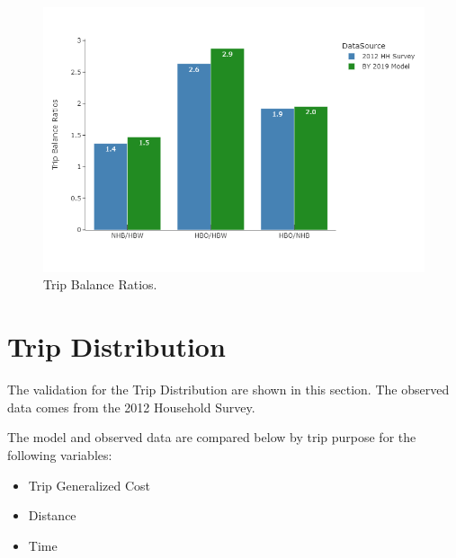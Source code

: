 \documentclass[
  letterpaper,
  DIV=11,
  numbers=noendperiod]{scrreprt}
\providecommand{\tightlist}{%
  \setlength{\itemsep}{0pt}\setlength{\parskip}{0pt}}\usepackage{longtable,booktabs,array}
\begin{document}
\begin{figure}[H]

{\centering \includegraphics{v9x/v900/validation/_pictures/4-plot3.png}

}

\caption{\label{fig-pdf-prod-prod}Trip Balance Ratios.}

\end{figure}


\hypertarget{trip-distribution}{%
\chapter{Trip Distribution}\label{trip-distribution}}

The validation for the Trip Distribution are shown in this section. The
observed data comes from the 2012 Household Survey.

The model and observed data are compared below by trip purpose for the
following variables:

\begin{itemize}
\tightlist
\item
  Trip Generalized Cost
\item
  Distance
\item
  Time
\end{itemize}
\end{document}
